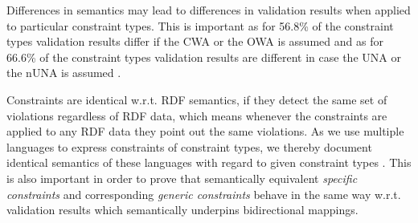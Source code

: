\documentclass[a4paper,fontsize=11pt]{scrartcl}
\begin{document}
%
%
%
%
%
%
Differences in semantics may lead to differences in validation results when applied to particular constraint types.
This is important 
as for 56.8\% of the constraint types validation results differ if the CWA or the OWA is assumed 
and as for 66.6\% of the constraint types validation results are different in case the UNA or the nUNA is assumed \cite{BoschNolleAcarEckert2015}.

Constraints are identical w.r.t. RDF semantics, 
if they detect the same set of violations regardless of RDF data, 
which means whenever the constraints are applied to any RDF data they point out the same violations.
As we use multiple languages to express constraints of constraint types, 
we thereby document identical semantics of these languages with regard to given constraint types \cite{BoschNolleAcarEckert2015}.
This is also important in order to prove that semantically equivalent \emph{specific constraints} and corresponding \emph{generic constraints}
behave in the same way w.r.t. validation results which semantically underpins bidirectional mappings.
\end{document}
